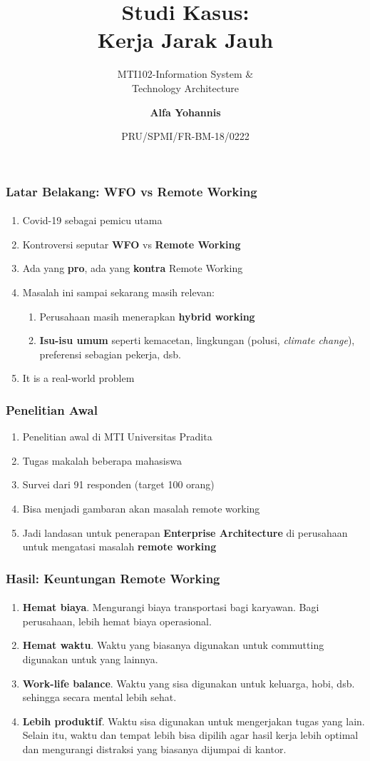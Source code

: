 \documentclass[aspectratio=169, table]{beamer}
\subtitle{MTI102-Information System \&\\Technology Architecture}
\title{Studi Kasus:\\Kerja Jarak Jauh}
\date[Serial]{\scriptsize {PRU/SPMI/FR-BM-18/0222}}
\author[Pradita]{\small {\textbf{Alfa Yohannis}}}
\begin{document}
	\frame{\titlepage}

	\begin{frame}
		\frametitle{Latar Belakang: WFO vs Remote Working}
		\framesubtitle{\hspace{1cm}}
		\begin{enumerate}
			\item Covid-19 sebagai pemicu utama
			\item Kontroversi seputar \textbf{WFO} vs \textbf{Remote Working}
			\item Ada yang \textbf{pro}, ada yang \textbf{kontra} Remote Working
			\item Masalah ini sampai sekarang masih relevan:
			\begin{enumerate}
				\item Perusahaan masih menerapkan \textbf{hybrid working}
				\item \textbf{Isu-isu umum} seperti kemacetan, lingkungan (polusi, \textit{climate change}), preferensi sebagian pekerja, dsb.
			\end{enumerate}
			\item It is a real-world problem
		\end{enumerate}
	\end{frame}

	\begin{frame}
		\frametitle{Penelitian Awal}
		\begin{enumerate}
			\item Penelitian awal di MTI Universitas Pradita
			\item Tugas makalah beberapa mahasiswa
			\item Survei dari  91 responden (target 100 orang)
			\item Bisa menjadi gambaran akan masalah remote working
			\item Jadi landasan untuk penerapan \textbf{Enterprise Architecture} di perusahaan untuk mengatasi masalah \textbf{remote working}
		\end{enumerate}
	\end{frame}

	\begin{frame}
		\frametitle{Hasil: Keuntungan Remote Working}
		\framesubtitle{\hspace{1cm}}
		\begin{enumerate}
			\item \textbf{Hemat biaya}. Mengurangi biaya transportasi bagi karyawan. Bagi perusahaan, lebih hemat biaya operasional.
			\item \textbf{Hemat waktu}. Waktu yang biasanya digunakan untuk commutting digunakan untuk yang lainnya.
			\item \textbf{Work-life balance}. Waktu yang sisa digunakan untuk keluarga, hobi, dsb. sehingga secara mental lebih sehat.
			\item \textbf{Lebih produktif}. Waktu sisa digunakan untuk mengerjakan tugas yang lain. Selain itu, waktu dan tempat lebih bisa dipilih agar hasil kerja lebih optimal dan mengurangi distraksi yang biasanya dijumpai di kantor.
		\end{enumerate}
	\end{frame}
\end{document}
